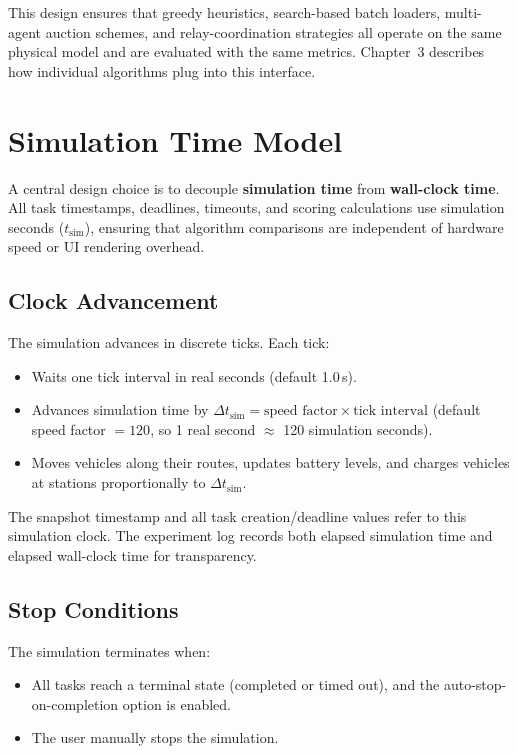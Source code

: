 This design ensures that greedy heuristics, search-based batch loaders, multi-agent auction schemes, and relay-coordination strategies all operate on the same physical model and are evaluated with the same metrics. Chapter~3 describes how individual algorithms plug into this interface.

\section{Simulation Time Model}

A central design choice is to decouple \textbf{simulation time} from \textbf{wall-clock time}. All task timestamps, deadlines, timeouts, and scoring calculations use simulation seconds ($t_{\text{sim}}$), ensuring that algorithm comparisons are independent of hardware speed or UI rendering overhead.

\subsection{Clock Advancement}

The simulation advances in discrete ticks. Each tick:
\begin{itemize}[leftmargin=4em]
    \item Waits one tick interval in real seconds (default 1.0\,s).
    \item Advances simulation time by $\Delta t_{\text{sim}} = \text{speed factor} \times \text{tick interval}$ (default speed factor $= 120$, so 1 real second $\approx$ 120 simulation seconds).
    \item Moves vehicles along their routes, updates battery levels, and charges vehicles at stations proportionally to $\Delta t_{\text{sim}}$.
\end{itemize}

The snapshot timestamp and all task creation/deadline values refer to this simulation clock. The experiment log records both elapsed simulation time and elapsed wall-clock time for transparency.

\subsection{Stop Conditions}

The simulation terminates when:
\begin{itemize}[leftmargin=4em]
    \item All tasks reach a terminal state (completed or timed out), and the auto-stop-on-completion option is enabled.
    \item The user manually stops the simulation.
\end{itemize}

